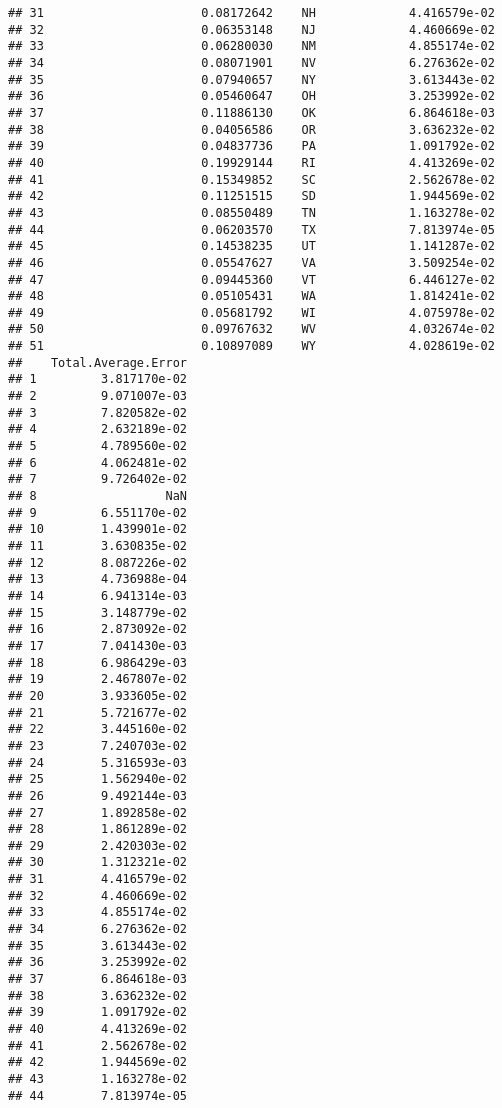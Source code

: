 \documentclass{article}\usepackage[]{graphicx}\usepackage[]{color}
\makeatletter
\newenvironment{kframe}{%
 \def\at@end@of@kframe{}%
 \ifinner\ifhmode%
  \def\at@end@of@kframe{\end{minipage}}%
  \begin{minipage}{\columnwidth}%
 \fi\fi%
 \def\FrameCommand##1{\hskip\@totalleftmargin \hskip-\fboxsep
 \colorbox{shadecolor}{##1}\hskip-\fboxsep
     \hskip-\linewidth \hskip-\@totalleftmargin \hskip\columnwidth}%
 \MakeFramed {\advance\hsize-\width
   \@totalleftmargin\z@ \linewidth\hsize
   \@setminipage}}%
 {\par\unskip\endMakeFramed%
 \at@end@of@kframe}
\newenvironment{knitrout}{}{} %
\makeatother
\begin{document}
\begin{knitrout}
\begin{kframe}
\begin{verbatim}
## 31                      0.08172642    NH             4.416579e-02
## 32                      0.06353148    NJ             4.460669e-02
## 33                      0.06280030    NM             4.855174e-02
## 34                      0.08071901    NV             6.276362e-02
## 35                      0.07940657    NY             3.613443e-02
## 36                      0.05460647    OH             3.253992e-02
## 37                      0.11886130    OK             6.864618e-03
## 38                      0.04056586    OR             3.636232e-02
## 39                      0.04837736    PA             1.091792e-02
## 40                      0.19929144    RI             4.413269e-02
## 41                      0.15349852    SC             2.562678e-02
## 42                      0.11251515    SD             1.944569e-02
## 43                      0.08550489    TN             1.163278e-02
## 44                      0.06203570    TX             7.813974e-05
## 45                      0.14538235    UT             1.141287e-02
## 46                      0.05547627    VA             3.509254e-02
## 47                      0.09445360    VT             6.446127e-02
## 48                      0.05105431    WA             1.814241e-02
## 49                      0.05681792    WI             4.075978e-02
## 50                      0.09767632    WV             4.032674e-02
## 51                      0.10897089    WY             4.028619e-02
##    Total.Average.Error
## 1         3.817170e-02
## 2         9.071007e-03
## 3         7.820582e-02
## 4         2.632189e-02
## 5         4.789560e-02
## 6         4.062481e-02
## 7         9.726402e-02
## 8                  NaN
## 9         6.551170e-02
## 10        1.439901e-02
## 11        3.630835e-02
## 12        8.087226e-02
## 13        4.736988e-04
## 14        6.941314e-03
## 15        3.148779e-02
## 16        2.873092e-02
## 17        7.041430e-03
## 18        6.986429e-03
## 19        2.467807e-02
## 20        3.933605e-02
## 21        5.721677e-02
## 22        3.445160e-02
## 23        7.240703e-02
## 24        5.316593e-03
## 25        1.562940e-02
## 26        9.492144e-03
## 27        1.892858e-02
## 28        1.861289e-02
## 29        2.420303e-02
## 30        1.312321e-02
## 31        4.416579e-02
## 32        4.460669e-02
## 33        4.855174e-02
## 34        6.276362e-02
## 35        3.613443e-02
## 36        3.253992e-02
## 37        6.864618e-03
## 38        3.636232e-02
## 39        1.091792e-02
## 40        4.413269e-02
## 41        2.562678e-02
## 42        1.944569e-02
## 43        1.163278e-02
## 44        7.813974e-05

\end{verbatim}
\end{kframe}
\end{knitrout}
\end{document}
